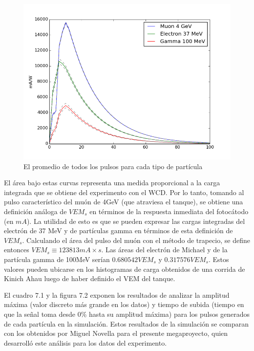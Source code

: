 \documentclass{book}
\begin{document}
\begin{figure}[h] %
\begin{center}
 \includegraphics[width=\linewidth]{PulsosCaracteristicos.png}
\caption{El promedio de todos los pulsos para cada tipo de part\'icula}
\end{center}
\end{figure}

El \'area bajo estas curvas representa una medida proporcional a la carga integrada que se obtiene del experimento con el WCD. Por lo tanto, tomando al pulso caracter\'istico del mu\'on de 4GeV (que atraviesa el tanque), se obtiene una definici\'on an\'aloga de $VEM_s$ en t\'erminos de la respuesta inmediata del fotoc\'atodo (en $mA$). La utilidad de esto es que se pueden expresar las cargas integradas del electr\'on de 37 MeV y de part\'iculas gamma en t\'erminos de esta definici\'on de $VEM_s$. Calculando el \'area del pulso del mu\'on con el m\'etodo de trapecio, se define entonces $VEM_s \equiv 123813 mA\times s$. Las \'areas del electr\'on de Michael y de la part\'icula gamma de 100MeV ser\'ian $0.680542 VEM_s$ y $0.317576 VEM_s$. Estos valores pueden ubicarse en los histogramas de carga obtenidos de una corrida de Kinich Ahau luego de haber definido el VEM del tanque.

El cuadro 7.1 y la figura 7.2 exponen los resultados de analizar la amplitud m\'axima (valor discreto m\'as grande en los datos) y tiempo de subida (tiempo en que la se\~nal toma desde 0\% hasta su amplitud m\'axima) para los pulsos generados de cada part\'icula en la simulaci\'on. Estos resultados de la simulaci\'on se comparan con los obtenidos por Miguel Novella para el presente megaproyecto, quien desarroll\'o este an\'alisis para los datos del experimento.
\end{document}
